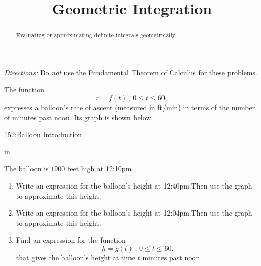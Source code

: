 \documentclass{ximera}
\title{Geometric Integration}
\newcommand{\pskip}{\vskip 0.1 in}
\begin{document}
\begin{abstract}
Evaluating or approximating definite integrals geometrically.
\end{abstract}
\maketitle


\emph{Directions:} Do \emph{not} use the Fundamental Theorem of Calculus for these problems.

\begin{question} \label{EUERr3rDR}
The function 
\[
    r = f(t) \, , \, 0\leq t \leq  60 , 
\]
expresses a balloon's rate of ascent (measured in ft/min) in terms of the number of minutes past noon. Its graph is shown below.

\begin{onlineOnly}
    \begin{center}
\end{center}
\end{onlineOnly}

\href{https://www.desmos.com/calculator/tgi5yiuzab}{152:Balloon Introduction}

\pskip

The balloon is $1900$ feet high at 12:10pm.

\begin{enumerate}
\item Write an expression for the balloon's height at 12:40pm.Then use the graph to approximate this height.

\item Write an expression for the balloon's height at 12:04pm.Then use the graph to approximate this height.

\item Find an expression for the function 
\[
         h=g(t) \, , \, 0\leq t \leq 60, 
\]
that gives the balloon's height at time $t$ minutes past noon.
\end{enumerate}
\end{question}
\end{document}
